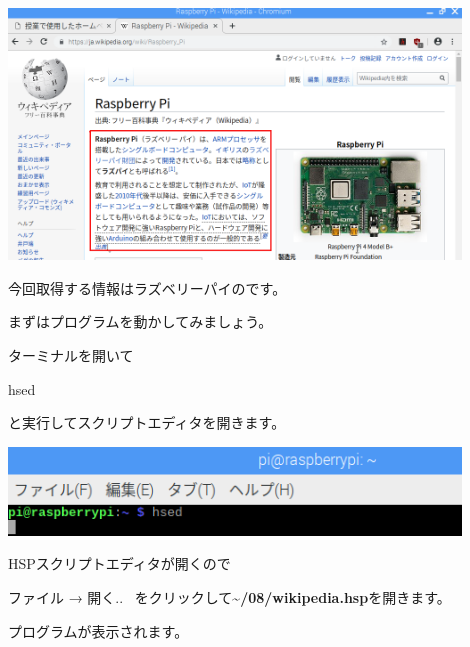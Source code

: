 \begin{center}
\includegraphics[width=0.9\textwidth]{./text08-img/textbook-img059.png}

\end{center}
今回取得する情報はラズベリーパイのです。

まずはプログラムを動かしてみましょう。

ターミナルを開いて

hsed

と実行してスクリプトエディタを開きます。



\begin{center}
\includegraphics[width=0.9\textwidth]{./text08-img/textbook-img013.png}

\end{center}

\bigskip

\clearpage
HSPスクリプトエディタが開くので


\bigskip

ファイル → 開く..
\ をクリックして\textbf{{\textasciitilde}/08/wikipedia.hsp}を開きます。

プログラムが表示されます。




